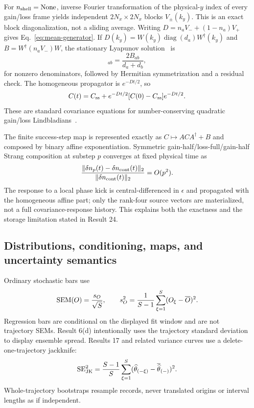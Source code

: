 \documentclass[aps,prb,twocolumn,floatfix,nofootinbib,superscriptaddress]{revtex4-2}
\begin{document}
For $n_{\rm shell}=\mathrm{None}$, inverse Fourier transformation of the physical-$y$
index of every gain/loss frame yields independent $2N_x\times2N_x$ blocks
$V_\pm(k_y)$.  This is an exact block diagonalization, not a sliding average.  Writing
$D=n_aV_-+(1-n_a)V_+$ gives Eq.~\eqref{eq:mean-generator}.  If
$D(k_y)=W(k_y)\operatorname{diag}(d_a)W^\dagger(k_y)$ and
$B=W^\dagger(n_aV_-)W$, the stationary Lyapunov solution~\cite{BartelsStewart1972} is
\begin{equation}
 [W^\dagger C_{\rm ss}W]_{ab}=\frac{2B_{ab}}{d_a+d_b},
 \label{eq:atlas-lyapunov-solution}
\end{equation}
for nonzero denominators, followed by Hermitian symmetrization and a residual check.
The homogeneous propagator is $e^{-Dt/2}$, so
\begin{equation}
 C(t)=C_{\rm ss}
 +e^{-Dt/2}[C(0)-C_{\rm ss}]e^{-Dt/2}.
 \label{eq:atlas-continuous-solution}
\end{equation}
These are standard covariance equations for number-conserving quadratic gain/loss
Lindbladians~\cite{Prosen2008,EisertProsen2010}.

The finite success-step map is represented exactly as
$C\mapsto ACA^\dagger+B$ and composed by binary affine exponentiation.  Symmetric
gain-half/loss-full/gain-half Strang composition at substep $p$ converges at fixed
physical time as
\begin{equation}
 \frac{\|\delta n_p(t)-\delta n_{\rm cont}(t)\|_2}
 {\|\delta n_{\rm cont}(t)\|_2}=O(p^2).
 \label{eq:atlas-strang-convergence}
\end{equation}
The response to a local phase kick is central-differenced in $\epsilon$ and propagated
with the homogeneous affine part; only the rank-four source vectors are materialized, not
a full covariance-response history.  This explains both the exactness and the storage
limitation stated in Result 24.

\subsection{Distributions, conditioning, maps, and uncertainty semantics}
\label{app:statistics-formalism}

Ordinary stochastic bars use
\begin{equation}
 {\rm SEM}(O)=\frac{s_O}{\sqrt S},\qquad
 s_O^2=\frac1{S-1}\sum_{\xi=1}^{S}(O_\xi-\overline O)^2.
 \label{eq:atlas-sem}
\end{equation}
Regression bars are conditional on the displayed fit window and are not trajectory SEMs.
Result 6(d) intentionally uses the trajectory standard deviation to display ensemble
spread.  Results 17 and related variance curves use a delete-one-trajectory jackknife:
\begin{equation}
 {\rm SE}_{\rm JK}^2=\frac{S-1}{S}\sum_{\xi=1}^{S}
 (\widehat\theta_{(-\xi)}-\overline{\widehat\theta}_{(-)})^2.
 \label{eq:atlas-jackknife}
\end{equation}
Whole-trajectory bootstraps resample records, never translated origins or interval
lengths as if independent.
\end{document}
